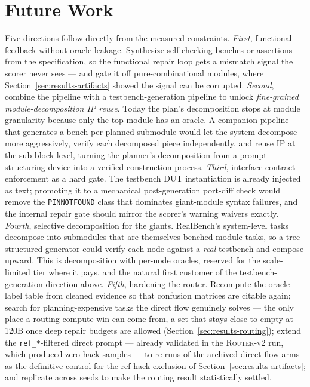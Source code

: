 \section{Future Work}
\label{sec:future}

Five directions follow directly from the measured constraints.
\emph{First}, functional feedback without oracle leakage. Synthesize
self-checking benches or assertions from the specification, so the
functional repair loop gets a mismatch signal the scorer never sees ---
and gate it off pure-combinational modules, where
Section~\ref{sec:results-artifacts} showed the signal can be corrupted.
\emph{Second}, combine the pipeline with a testbench-generation
pipeline to unlock \emph{fine-grained module-decomposition IP reuse}.
Today the plan's decomposition stops at module granularity because only
the top module has an oracle. A companion pipeline that generates a
bench per planned submodule would let the system decompose more
aggressively, verify each decomposed piece independently, and reuse IP
at the sub-block level, turning the planner's decomposition from a
prompt-structuring device into a verified construction process.
\emph{Third}, interface-contract enforcement as a hard gate. The
testbench DUT instantiation is already injected as text; promoting it to
a mechanical post-generation port-diff check would remove the
\texttt{PINNOTFOUND} class that dominates giant-module syntax failures,
and the internal repair gate should mirror the scorer's warning waivers
exactly. \emph{Fourth}, selective decomposition for the giants.
RealBench's system-level tasks decompose into submodules that are
themselves benched module tasks, so a tree-structured generator could
verify each node against a \emph{real} testbench and compose upward.
This is decomposition with per-node oracles, reserved for the
scale-limited tier where it pays, and the natural first customer of the
testbench-generation direction above. \emph{Fifth}, hardening the
router. Recompute the oracle label table from cleaned evidence so
that confusion matrices are citable again; search for
planning-expensive tasks the direct flow genuinely solves --- the only
place a routing compute win can come from, a set that stays close to
empty at 120B once deep repair budgets are allowed
(Section~\ref{sec:results-routing}); extend the
\texttt{ref\_*}-filtered direct prompt --- already validated in the
\textsc{Router-v2} run, which produced zero hack samples --- to
re-runs of the archived direct-flow arms as the definitive control for
the ref-hack exclusion of Section~\ref{sec:results-artifacts}; and
replicate across seeds to make the routing result statistically
settled.

